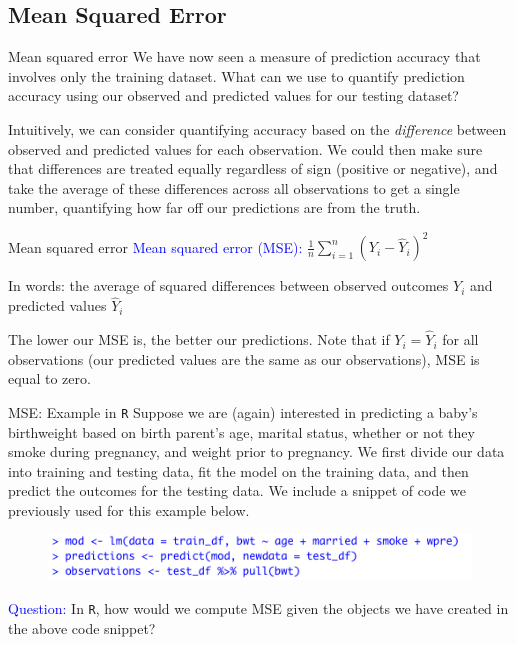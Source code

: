 \documentclass[10pt,t]{beamer}
\begin{document}
\subsection{Mean Squared Error}

\begin{frame}{Mean squared error}
We have now seen a measure of prediction accuracy that involves only the training dataset. What can we use to quantify prediction accuracy using our observed and predicted values for our testing dataset?

\vspace{0.3cm}

Intuitively, we can consider quantifying accuracy based on the \textit{difference} between observed and predicted values for each observation. We could then make sure that differences are treated equally regardless of sign (positive or negative), and take the average of these differences across all observations to get a single number, quantifying how far off our predictions are from the truth.  
\end{frame}

\begin{frame}{Mean squared error}
\textcolor{blue}{Mean squared error (MSE):} $\frac{1}{n} \sum_{i = 1}^n (Y_i - \hat{Y}_i)^2$

\vspace{0.3cm} In words: the average of squared differences between observed outcomes $Y_i$ and predicted values $\hat{Y}_i$

\vspace{0.3cm} \pause
The lower our MSE is, the better our predictions. Note that if $Y_i = \hat{Y}_i$ for all observations (our predicted values are the same as our observations), MSE is equal to zero.
\end{frame}

\begin{frame}{MSE: Example in \texttt{R}}
Suppose we are (again) interested in predicting a baby's birthweight based on birth parent's age, marital status, whether or not they smoke during pregnancy, and weight prior to pregnancy. We first divide our data into training and testing data, fit the model on the training data, and then predict the outcomes for the testing data. We include a snippet of code we previously used for this example below.

\vspace{0.3cm}

\begin{figure}
	\centering \includegraphics[scale=0.5]{figures/mse1.png}
\end{figure}

\vspace{0.3cm} \pause

\textcolor{blue}{Question:} In \texttt{R}, how would we compute MSE given the objects we have created in the above code snippet?
\end{frame}
\end{document}
